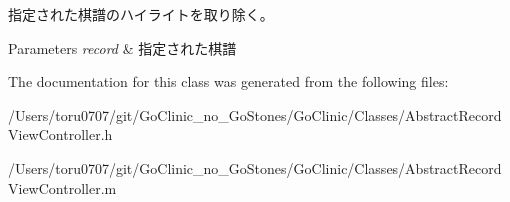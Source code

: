 \label{interface_abstract_record_view_controller_a564c9cd96efeef4230c25e281956100a}
指定された棋譜のハイライトを取り除く。 
\begin{DoxyParams}{Parameters}
{\em record} & 指定された棋譜 \\
\hline
\end{DoxyParams}


The documentation for this class was generated from the following files:\begin{DoxyCompactItemize}
\item 
/Users/toru0707/git/GoClinic\_\-no\_\-GoStones/GoClinic/Classes/AbstractRecordViewController.h\item 
/Users/toru0707/git/GoClinic\_\-no\_\-GoStones/GoClinic/Classes/AbstractRecordViewController.m\end{DoxyCompactItemize}
